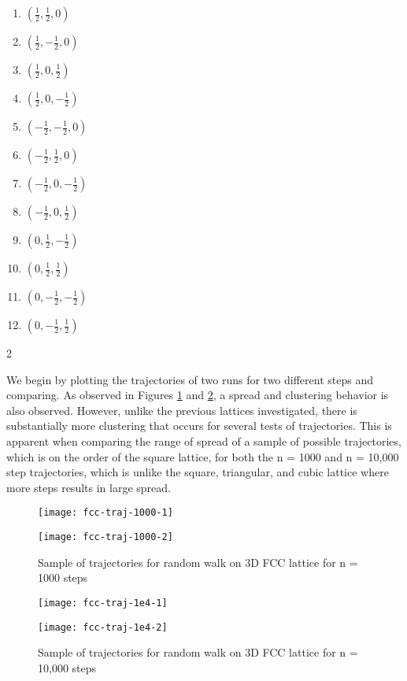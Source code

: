 \documentclass[12pt, oneside]{article}
\begin{document}
\begin{multicols}{2}
 \begin{enumerate}
   \item $(\frac{1}{2}, \frac{1}{2}, 0)$
   \item $(\frac{1}{2}, -\frac{1}{2}, 0)$
   \item $(\frac{1}{2}, 0, \frac{1}{2})$
   \item $(\frac{1}{2}, 0, -\frac{1}{2})$
   \item $(-\frac{1}{2}, -\frac{1}{2}, 0)$
   \item $(-\frac{1}{2}, \frac{1}{2}, 0)$
   \item $(-\frac{1}{2}, 0, -\frac{1}{2})$
   \item $(-\frac{1}{2}, 0, \frac{1}{2})$
   \item $(0, \frac{1}{2}, -\frac{1}{2})$
   \item $(0, \frac{1}{2}, \frac{1}{2})$
   \item $(0, -\frac{1}{2}, -\frac{1}{2})$
   \item $(0, -\frac{1}{2}, \frac{1}{2})$
 \end{enumerate}
 \end{multicols}{2}
 
 We begin by plotting the trajectories of two runs for two different steps and comparing. As observed in Figures \ref{fig:fcctraj1000} and \ref{fig:fcctraj1e4}, a spread and clustering behavior is also observed. However, unlike the previous lattices investigated, there is substantially more clustering that occurs for several tests of trajectories. This is apparent when comparing the range of spread of a sample of possible trajectories, which is on the order of the square lattice, for both the n = 1000 and n = 10,000 step trajectories, which is unlike the square, triangular, and cubic lattice where more steps results in large spread.

\begin{figure}
\begin{minipage}[htbp]{.49\linewidth}
\centering
\texttt{[image: fcc-traj-1000-1]}
\end{minipage}
\begin{minipage}[htbp]{.49\linewidth}
\centering
\texttt{[image: fcc-traj-1000-2]}
\end{minipage}
\caption{Sample of trajectories for random walk on 3D FCC lattice for n = 1000 steps}
\label{fig:fcctraj1000}
\end{figure}

\begin{figure}
\begin{minipage}[htbp]{.49\linewidth}
\centering
\texttt{[image: fcc-traj-1e4-1]}
\end{minipage}
\begin{minipage}[htbp]{.49\linewidth}
\centering
\texttt{[image: fcc-traj-1e4-2]}
\end{minipage}
\caption{Sample of trajectories for random walk on 3D FCC lattice for n = 10,000 steps}
\label{fig:fcctraj1e4}
\end{figure}
\end{document}
